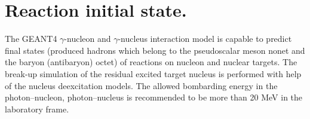 \section{Reaction initial state.}

\hspace{1.0em} The GEANT4 $\gamma$-nucleon and $\gamma$-nucleus 
interaction model is capable to predict 
 final states (produced 
hadrons 
which belong to the pseudoscalar meson nonet and the baryon (antibaryon) 
octet) of reactions on nucleon and nuclear targets. The break-up simulation of 
the residual 
excited target nucleus is performed with help of the nucleus deexcitation
models. 
 The allowed bombarding energy in 
the photon--nucleon, 
  photon--nucleus is recommended to be more than 
 20 MeV in the laboratory frame.
 
